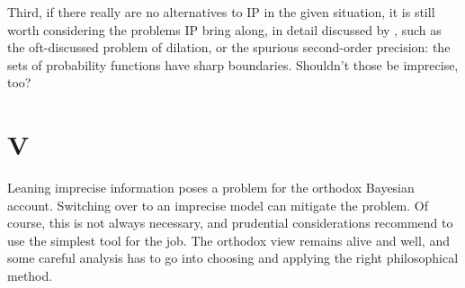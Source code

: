 \documentclass[11pt, a4paper]{scrartcl}
\begin{document}
Third, if there really are no alternatives to IP in the given situation, it is still worth considering the problems IP bring along, in detail discussed by \citep{sep-imprecise-probabilities}, such as the oft-discussed problem of dilation, or the spurious second-order precision: the sets of probability functions have sharp boundaries. Shouldn't those be imprecise, too?  

\section{V}

Leaning imprecise information poses a problem for the orthodox Bayesian account. Switching over to an imprecise model can mitigate the problem. Of course, this is not always necessary, and prudential considerations recommend to use the simplest tool for the job. The orthodox view remains alive and well, and some careful analysis has to go into choosing and applying the right philosophical method. 


\begin{singlespacing}
\printbibliography{}
\end{singlespacing}
\end{document}
